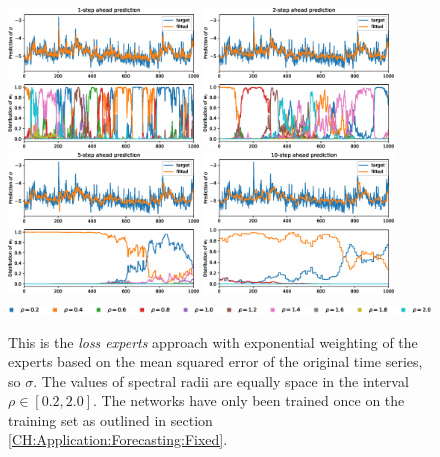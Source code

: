\begin{figure}
    \begin{center}
        \includegraphics[width=0.45\textwidth]{Plots/Prediction/Experts_MSE_1step.eps}
        \includegraphics[width=0.45\textwidth]{Plots/Prediction/Experts_MSE_2step.eps} \\
        \includegraphics[width=0.45\textwidth]{Plots/Prediction/Experts_MSE_5step.eps}
        \includegraphics[width=0.45\textwidth]{Plots/Prediction/Experts_MSE_10step.eps} \\
        \includegraphics[width=1.0\textwidth]{Plots/Prediction/legend_experts.eps}
        \label{FIG:ExpertsMSE}
    \end{center}
    \caption{This is the \textit{loss experts} approach with exponential weighting of the experts based on the mean squared error of the original time series, so $\sigma$. The values of spectral radii are equally space in the interval $\rho \in [0.2, 2.0]$. The networks have only been trained once on the training set as outlined in section \ref{CH:Application:Forecasting:Fixed}.}
\end{figure}

